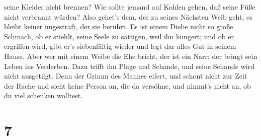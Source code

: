 seine Kleider nicht brennen?  Wie sollte jemand auf Kohlen
gehen, daß seine Füße nicht verbrannt würden?  Also gehet's
dem, der zu seines Nächsten Weib geht; es bleibt keiner ungestraft, der
sie berührt.  Es ist einem Diebe nicht so große Schmach, ob
er stiehlt, seine Seele zu sättigen, weil ihn hungert;  und
ob er ergriffen wird, gibt er's siebenfältig wieder und legt dar alles
Gut in seinem Hause.  Aber wer mit einem Weibe die Ehe
bricht, der ist ein Narr; der bringt sein Leben ins Verderben.
 Dazu trifft ihn Plage und Schande, und seine Schande wird
nicht ausgetilgt.  Denn der Grimm des Mannes eifert, und
schont nicht zur Zeit der Rache  und sieht keine Person an,
die da versöhne, und nimmt's nicht an, ob du viel schenken wolltest.

\hypertarget{section-6}{%
\section{7}\label{section-6}}

